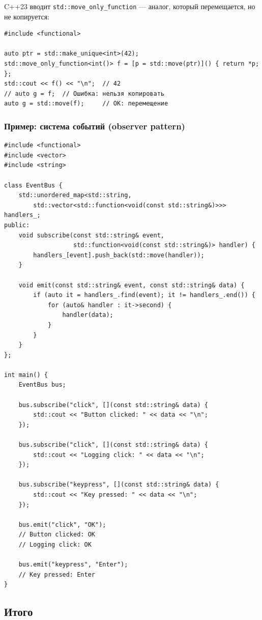 \documentclass[a4paper,12pt]{article}
\begin{document}
C++23 вводит \texttt{std::move\_only\_function} --- аналог, который
перемещается, но не копируется:

\begin{lstlisting}
#include <functional>

auto ptr = std::make_unique<int>(42);
std::move_only_function<int()> f = [p = std::move(ptr)]() { return *p; };
std::cout << f() << "\n";  // 42
// auto g = f;  // Ошибка: нельзя копировать
auto g = std::move(f);     // OK: перемещение
\end{lstlisting}

\subsubsection{Пример: система событий (observer pattern)}

\begin{lstlisting}
#include <functional>
#include <vector>
#include <string>

class EventBus {
    std::unordered_map<std::string,
        std::vector<std::function<void(const std::string&)>>> handlers_;
public:
    void subscribe(const std::string& event,
                   std::function<void(const std::string&)> handler) {
        handlers_[event].push_back(std::move(handler));
    }

    void emit(const std::string& event, const std::string& data) {
        if (auto it = handlers_.find(event); it != handlers_.end()) {
            for (auto& handler : it->second) {
                handler(data);
            }
        }
    }
};

int main() {
    EventBus bus;

    bus.subscribe("click", [](const std::string& data) {
        std::cout << "Button clicked: " << data << "\n";
    });

    bus.subscribe("click", [](const std::string& data) {
        std::cout << "Logging click: " << data << "\n";
    });

    bus.subscribe("keypress", [](const std::string& data) {
        std::cout << "Key pressed: " << data << "\n";
    });

    bus.emit("click", "OK");
    // Button clicked: OK
    // Logging click: OK

    bus.emit("keypress", "Enter");
    // Key pressed: Enter
}
\end{lstlisting}

\subsection{Итого}
\end{document}
